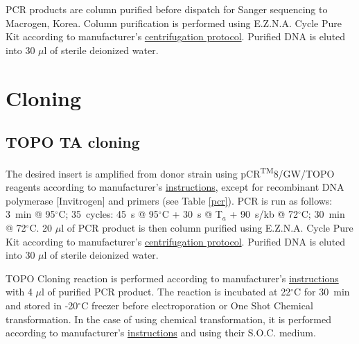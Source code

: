 PCR products are column purified before dispatch for Sanger sequencing to Macrogen, Korea.
Column purification is performed using E.Z.N.A.\textsuperscript{\textregistered} Cycle Pure Kit according to manufacturer's \href{http://omegabiotek.com/store/wp-content/uploads/2013/09/D6492_D6493-Cycle-Pure-Kit-Combo-Online.pdf}{centrifugation protocol}.
Purified DNA is eluted into 30 $\mu$l of sterile deionized water.

\section{Cloning}
\subsection{TOPO TA cloning}
The desired insert is amplified from donor strain using pCR\textsuperscript{TM}8/GW/TOPO\textsuperscript{\textregistered} reagents according to manufacturer's \href{https://assets.thermofisher.com/TFS-Assets/LSG/manuals/pcr8gwtopo_man.pdf}{instructions}, except for recombinant  DNA polymerase [Invitrogen] and primers (see Table \ref{pcr}).
PCR is run as follows: 3~min @ 95$^{\circ}$C; 35~cycles: 45~s @ 95$^{\circ}$C + 30~s @ T$_{a}$ + 90~s/kb @ 72$^{\circ}$C; 30~min @ 72$^{\circ}$C.
20 $\mu$l of PCR product is then column purified using E.Z.N.A.\textsuperscript{\textregistered} Cycle Pure Kit according to manufacturer's \href{http://omegabiotek.com/store/wp-content/uploads/2013/09/D6492_D6493-Cycle-Pure-Kit-Combo-Online.pdf}{centrifugation protocol}.
Purified DNA is eluted into 30 $\mu$l of sterile deionized water.

TOPO\textsuperscript{\textregistered} Cloning reaction is performed according to manufacturer's \href{https://assets.thermofisher.com/TFS-Assets/LSG/manuals/pcr8gwtopo_man.pdf}{instructions} with 4 $\mu$l of purified PCR product.
The reaction is incubated at 22$^{\circ}$C for 30~min and stored in -20$^{\circ}$C freezer before electroporation or One Shot\textsuperscript{\textregistered} Chemical transformation.
In the case of using chemical transformation, it is performed according to manufacturer's \href{https://assets.thermofisher.com/TFS-Assets/LSG/manuals/pcr8gwtopo_man.pdf}{instructions} and using their S.O.C. medium.

